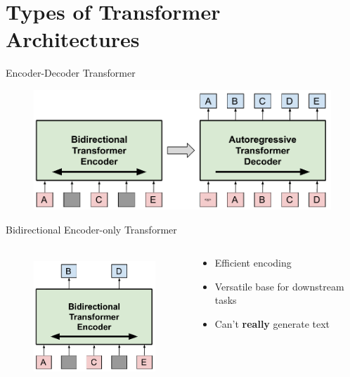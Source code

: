 \documentclass[12pt,aspectratio=169,handout]{beamer}
\begin{document}
\section{Types of Transformer Architectures}

\begin{frame}{Encoder-Decoder Transformer}

	\begin{figure}[h]
		\includegraphics[height=4.5cm]{transformer_enc_dec.pdf}
	\end{figure}

\end{frame}


\begin{frame}{Bidirectional Encoder-only Transformer}
\begin{columns}[T] %
	\begin{column}{.48\textwidth}
	\begin{figure}[h]
		\includegraphics[height=4.5cm]{bidirectional_trf_encoder.pdf}
	\end{figure}
	\end{column}
	
	\begin{column}{.48\textwidth}
		\begin{itemize}
			\item Efficient encoding 
			\item Versatile base for downstream tasks 
			\pause
			\item Can't \textbf{really} generate text 
		\end{itemize}
	\end{column}

\end{columns}
\end{frame}
\end{document}
